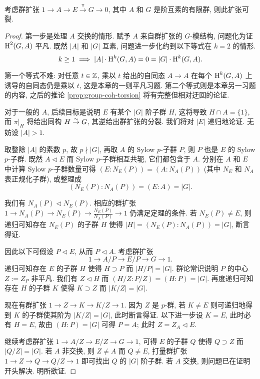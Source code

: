 \begin{theorem}\label{prop:Schur-Zassenhaus}
	考虑群扩张 $1 \to A \to E \xrightarrow{\pi} G \to 0$, 其中 $A$ 和 $G$ 是阶互素的有限群, 则此扩张可裂.
\end{theorem}
\begin{proof}
	第一步是处理 $A$ 交换的情形. 赋予 $A$ 来自群扩张的 $G$-模结构, 问题化为证 $\operatorname{H}^2(G, A)$ 平凡. 既然 $|A|$ 和 $|G|$ 互素, 问题进一步化约到以下等式在 $k=2$ 的情形.
	\[ k \geq 1 \implies  |A| \cdot \operatorname{H}^k(G, A) = 0 = |G| \cdot \operatorname{H}^k(G, A). \]
	
	第一个等式不难: 对任意 $t \in \mathbb{Z}$, 乘以 $t$ 给出的自同态 $A \to A$ 在每个 $\operatorname{H}^k(G, A)$ 上诱导的自同态仍是乘以 $t$, 这是本章的一则平凡习题. 第二个等式则是本章另一习题的内容, 之后的推论 \ref{prop:group-coh-torsion} 将有完整但相对迂回的论证.

	对于一般的 $A$, 后续目标是说明 $E$ 有某个 $|G|$ 阶子群 $H$, 这将导致 $H \cap A = \{1\}$, 而 $\pi|_H$ 将给出同构 $H \stackrel{\sim}{\rightarrow} G$, 其逆给出群扩张的分裂. 我们将对 $|E|$ 递归地论证. 无妨设 $|A| > 1$.
	
	取整除 $|A|$ 的素数 $p$, 故 $p \nmid |G|$, 再取 $A$ 的 Sylow $p$-子群 $P$, 则 $P$ 也是 $E$ 的 Sylow $p$-子群. 既然 $A \lhd E$ 而 Sylow $p$-子群相互共轭, 它们都包含于 $A$. 分别在 $A$ 和 $E$ 中计算 Sylow $p$-子群数量可得 $(E: N_E(P)) = (A: N_A(P))$ (其中 $N_E$ 和 $N_A$ 表正规化子群), 或整理成
	\[ (N_E(P):N_A(P)) = (E:A) = |G|. \]
	
	我们有 $N_A(P) \lhd N_E(P)$. 相应的群扩张 $1 \to N_A(P) \to N_E(P) \to \frac{N_E(P)}{N_A(P)} \to 1$ 仍满足定理的条件. 若 $N_E(P) \neq E$, 则递归可知存在 $N_E(P)$ 的子群 $H$ 使得 $|H| = (N_E(P):N_A(P)) = |G|$, 断言得证.
	
	因此以下可假设 $P \lhd E$, 从而 $P \lhd A$. 考虑群扩张
	\[ 1 \to A/P \to E/P \to G \to 1. \]
	递归可知存在 $E$ 的子群 $H$ 使得 $H \supset P$ 而 $|H/P| = |G|$. 群论常识说明 $P$ 的中心 $Z := Z_P$ 非平凡. 我们有 $Z \lhd H$ 而 $(H/Z : P/Z) = (H:P) = |G|$. 再度递归可知存在 $H$ 的子群 $K$ 使得 $K \supset Z$ 而 $|K/Z| = |G|$.
	
	现在有群扩张 $1 \to Z \to K \to K/Z \to 1$. 因为 $Z$ 是 $p$-群, 若 $K \neq E$ 则可递归地得到 $K$ 的子群使其阶为 $|K/Z| = |G|$, 此时断言得证. 以下进一步设 $K=E$, 此时必有 $H=E$, 故由 $(H:P) = |G|$ 可得 $P=A$; 此时 $Z = Z_A \lhd E$.
	
	继续考虑群扩张 $1 \to A/Z \to E/Z \to G \to 1$, 可得 $E$ 的子群 $Q$ 使得 $Q \supset Z$ 而 $|Q/Z| = |G|$. 若 $A$ 非交换, 则 $Z \neq A$ 而 $Q \neq E$, 打量群扩张 $1 \to Z \to Q \to Q/Z \to 1$ 即可找出 $Q$ 的 $|G|$ 阶子群. 若 $A$ 交换, 则问题已在证明开头解决. 明所欲证.
\end{proof}

